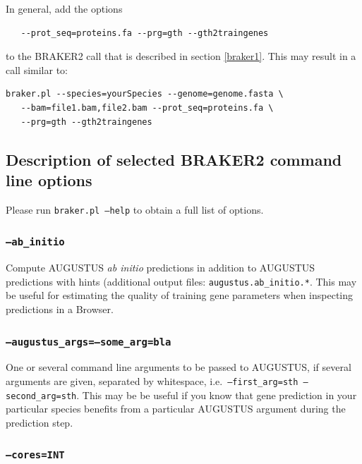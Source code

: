 \documentclass[]{article}
\begin{document}
In general, add the options

\begin{verbatim}
   --prot_seq=proteins.fa --prg=gth --gth2traingenes
\end{verbatim}

to the BRAKER2 call that is described in section \ref{braker1}. This may
result in a call similar to:

\begin{verbatim}
braker.pl --species=yourSpecies --genome=genome.fasta \
   --bam=file1.bam,file2.bam --prot_seq=proteins.fa \
   --prg=gth --gth2traingenes
\end{verbatim}

\subsection{Description of selected BRAKER2 command line options}\label{options}

Please run \texttt{braker.pl\ –help} to obtain a full list of options.

\subsubsection{\texorpdfstring{\texttt{–ab\_initio}}{--ab\_initio}}\label{ab_initio}

Compute AUGUSTUS \emph{ab initio} predictions in addition to AUGUSTUS
predictions with hints (additional output files:
\texttt{augustus.ab\_initio.*}. This may be useful for estimating the
quality of training gene parameters when inspecting predictions in a
Browser.

\subsubsection{\texorpdfstring{\texttt{–augustus\_args=–some\_arg=bla}}{--augustus\_args=--some\_arg=bla}}\label{augustus_argssome_argbla}

One or several command line arguments to be passed to AUGUSTUS, if
several arguments are given, separated by whitespace,
i.e.~\texttt{–first\_arg=sth\ –second\_arg=sth}. This may be be useful
if you know that gene prediction in your particular species benefits
from a particular AUGUSTUS argument during the prediction step.

\subsubsection{\texorpdfstring{\texttt{–cores=INT}}{--cores=INT}}\label{coresint}
\end{document}
